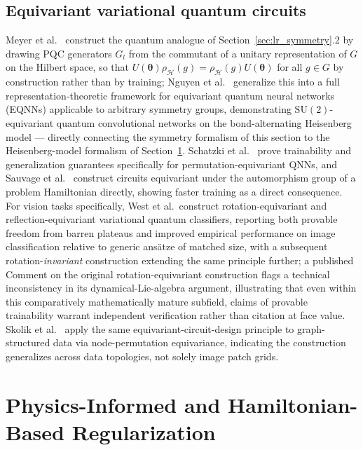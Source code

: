 \documentclass[11pt]{article}
\begin{document}
\subsection{Equivariant variational quantum circuits}
Meyer et al.\ \cite{Meyer2023} construct the quantum analogue of Section~\ref{sec:lr_symmetry}.2 by drawing PQC generators $G_l$ from the commutant of a unitary representation of $G$ on the Hilbert space, so that $U(\bm{\theta})\rho_{\mathcal{H}}(g) = \rho_{\mathcal{H}}(g)U(\bm{\theta})$ for all $g\in G$ by construction rather than by training; Nguyen et al.\ \cite{Nguyen2024EQNN} generalize this into a full representation-theoretic framework for equivariant quantum neural networks (EQNNs) applicable to arbitrary symmetry groups, demonstrating $\mathrm{SU}(2)$-equivariant quantum convolutional networks on the bond-alternating Heisenberg model — directly connecting the symmetry formalism of this section to the Heisenberg-model formalism of Section~\ref{sec:hamiltonian}. Schatzki et al.\ \cite{Schatzki2024} prove trainability and generalization guarantees specifically for permutation-equivariant QNNs, and Sauvage et al.\ \cite{Sauvage2024} construct circuits equivariant under the automorphism group of a problem Hamiltonian directly, showing faster training as a direct consequence. For vision tasks specifically, West et al.\ construct rotation-equivariant \cite{West2024} and reflection-equivariant \cite{West2023} variational quantum classifiers, reporting both provable freedom from barren plateaus and improved empirical performance on image classification relative to generic ansätze of matched size, with a subsequent rotation-\emph{invariant} construction \cite{West2025} extending the same principle further; a published Comment on the original rotation-equivariant construction flags a technical inconsistency in its dynamical-Lie-algebra argument, illustrating that even within this comparatively mathematically mature subfield, claims of provable trainability warrant independent verification rather than citation at face value. Skolik et al.\ \cite{Skolik2023} apply the same equivariant-circuit-design principle to graph-structured data via node-permutation equivariance, indicating the construction generalizes across data topologies, not solely image patch grids.

\section{Physics-Informed and Hamiltonian-Based Regularization}
\label{sec:hamiltonian}
\end{document}

